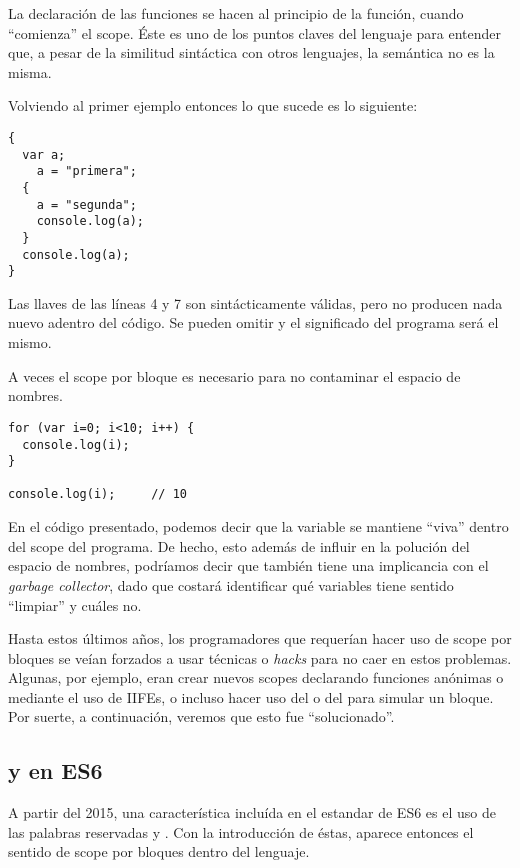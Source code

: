 La declaración de las funciones se hacen al principio de la función, cuando "`comienza"' el scope. Éste es uno de los puntos claves del lenguaje para entender que, a pesar de la similitud sintáctica con otros lenguajes, la semántica no es la misma. 

Volviendo al primer ejemplo entonces lo que sucede es lo siguiente:

\begin{lstlisting}
{
  var a;
	a = "primera";
  {
    a = "segunda";
    console.log(a);
  }
  console.log(a);
}
\end{lstlisting}

Las llaves \code{\{\}} de las líneas 4 y 7 son sintácticamente válidas, pero no producen nada nuevo adentro del código. Se pueden omitir y el significado del programa será el mismo.

A veces el scope por bloque es necesario para no contaminar el espacio de nombres. 

\begin{lstlisting}[title={Contaminando el espacio de nombres}]
for (var i=0; i<10; i++) {
  console.log(i);
}

console.log(i);		// 10
\end{lstlisting}

En el código presentado, podemos decir que la variable  se mantiene "`viva"' dentro del scope del programa. De hecho, esto además de influir en la polución del espacio de nombres, podríamos decir que también tiene una implicancia con el \textit{garbage collector}, dado que costará identificar qué variables tiene sentido "`limpiar"' y cuáles no.

Hasta estos últimos años, los programadores que requerían hacer uso de scope por bloques se veían forzados a usar técnicas o \textit{hacks} para no caer en estos problemas. Algunas, por ejemplo, eran crear nuevos scopes declarando funciones anónimas o mediante el uso de IIFEs, o incluso hacer uso del  o del  para simular un bloque. Por suerte, a continuación, veremos que esto fue "`solucionado"'.

\subsection{ y  en ES6}
\label{subsec:letyconst}

A partir del 2015, una característica incluída en el estandar de ES6 es el uso de las palabras reservadas  y . Con la introducción de éstas, aparece entonces el sentido de scope por bloques dentro del lenguaje.

